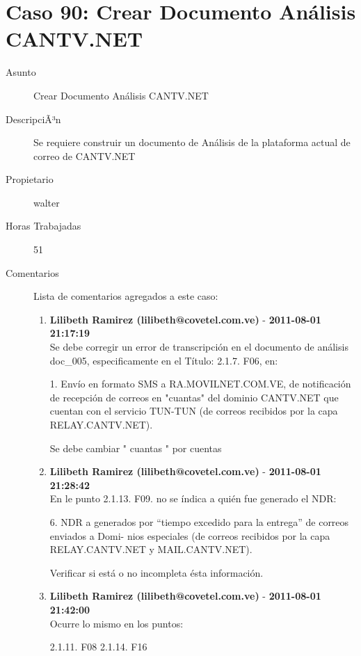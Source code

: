 \section{Caso 90: Crear Documento Análisis CANTV.NET }

\begin{description}

\item[Asunto] Crear Documento Análisis CANTV.NET\item[DescripciÃ³n] Se requiere construir un documento de Análisis de la plataforma actual de
correo de CANTV.NET\item[Propietario] walter\item[Horas Trabajadas] 51

\item[Comentarios] Lista de comentarios agregados a este caso:  
\begin{enumerate}
        \item {\bfseries Lilibeth Ramirez (lilibeth@covetel.com.ve)  } - {\bfseries 2011-08-01 21:17:19} \\ Se debe corregir un error de transcripción en el documento de análisis doc_005,
especificamente en el Título: 2.1.7. F06, en:

1. Envío en formato SMS a RA.MOVILNET.COM.VE, de notificación de recepción de
correos en "cuantas" del dominio CANTV.NET que cuentan con el servicio TUN-TUN
(de correos recibidos por la capa RELAY.CANTV.NET).

Se debe cambiar " cuantas " por cuentas        \item {\bfseries Lilibeth Ramirez (lilibeth@covetel.com.ve)  } - {\bfseries 2011-08-01 21:28:42} \\ En le punto 2.1.13. F09. no se índica a quién fue generado el NDR:

6. NDR a generados por “tiempo excedido para la entrega” de correos enviados a
Domi- nios especiales (de correos recibidos por la capa RELAY.CANTV.NET y
MAIL.CANTV.NET).

Verificar si está o no incompleta ésta información.        \item {\bfseries Lilibeth Ramirez (lilibeth@covetel.com.ve)  } - {\bfseries 2011-08-01 21:42:00} \\ Ocurre lo mismo en los puntos:

2.1.11. F08
2.1.14. F16


\end{enumerate}
\end{description}
